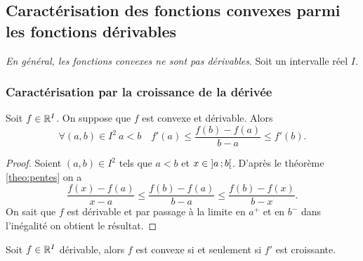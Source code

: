 \subsection[Caractérisation des fonctions convexes dans 
\(\deriv{I}{\R}\)]{Caractérisation des fonctions convexes parmi les fonctions 
dérivables}

\emph{En général, les fonctions convexes ne sont pas dérivables}. Soit un 
intervalle réel \(I\).

\subsubsection{Caractérisation par la croissance de la dérivée}

\begin{theo}\label{theo:croisderiv}
  Soit \(f \in \mathbb{R}^I\). On suppose que \(f\) est convexe et dérivable. Alors
  \begin{equation}
    \forall (a,b) \in I^2 \ a<b \quad f'(a) \leqslant \frac{f(b)-f(a)}{b-a} 
    \leqslant f'(b).
  \end{equation}
\end{theo}
\begin{proof}
  Soient \((a,b) \in I^2\) tels que \(a <b\) et \(x \in \left] a \, ;  b \right[\). 
  D'après le théorème~
  \ref{theo:pentes} on a
  \begin{equation}
    \frac{f(x)-f(a)}{x-a} \leqslant \frac{f(b)-f(a)}{b-a} \leqslant 
    \frac{f(b)-f(x)}{b-x}.
  \end{equation}
  On sait que \(f\) est dérivable et par passage à la limite en \(a^{+}\) et en 
  \(b^{-}\) dans l'inégalité on obtient le résultat.
\end{proof}
\begin{theo}
  Soit \(f \in \mathbb{R}^I\) dérivable, alors \(f\) est convexe si et seulement si 
  \(f'\) est croissante.
\end{theo}
